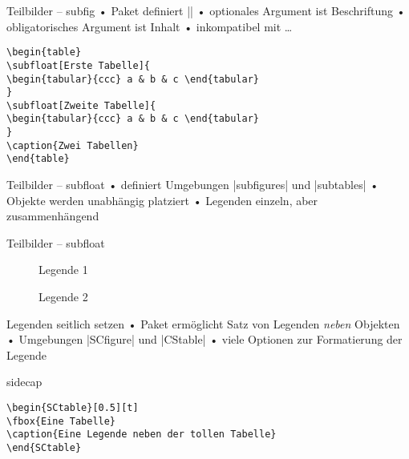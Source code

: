 \begin{frame}[fragile]{Teilbilder – subfig}
• Paket  definiert |\subfloat[]{}|
• optionales Argument ist Beschriftung
• obligatorisches Argument ist Inhalt
• inkompatibel mit  \dots
\•
\begin{lstlisting}
\begin{table}
\subfloat[Erste Tabelle]{
\begin{tabular}{ccc} a & b & c \end{tabular}
}
\subfloat[Zweite Tabelle]{
\begin{tabular}{ccc} a & b & c \end{tabular}
}
\caption{Zwei Tabellen}
\end{table}
\end{lstlisting}
\end{frame}

\begin{frame}[fragile]{Teilbilder – subfloat}
• definiert Umgebungen |subfigures| und |subtables|
• Objekte werden unabhängig platziert
• Legenden einzeln, aber zusammenhängend
\•
\end{frame}

\begin{frame}[fragile]{Teilbilder – subfloat}
\begin{LTXexample}[pos=b]
\begin{subfigures}
\begin{figure}
\caption{Legende 1}
\end{figure}
\begin{figure}
\caption{Legende 2}
\end{figure}
\end{subfigures}
\end{LTXexample}
\end{frame}

\begin{frame}[fragile]{Legenden seitlich setzen}
• Paket  ermöglicht Satz von Legenden \emph{neben} Objekten
• Umgebungen |SCfigure| und |CStable|
• viele Optionen zur Formatierung der Legende
\•
\end{frame}

\begin{frame}[fragile]{sidecap}
\begin{lstlisting}
\begin{SCtable}[0.5][t]
\fbox{Eine Tabelle}
\caption{Eine Legende neben der tollen Tabelle}
\end{SCtable}
\end{lstlisting}
\end{frame}

